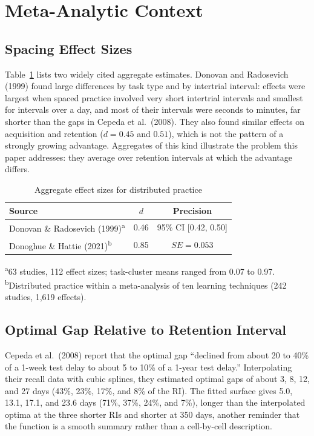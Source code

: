 \documentclass[10pt,twocolumn]{article}
\newcommand{\es}{d}
\begin{document}
\section{Meta-Analytic Context}

\subsection{Spacing Effect Sizes}

Table~\ref{tab:spacing} lists two widely cited aggregate estimates. Donovan and Radosevich (1999) found large differences by task type and by intertrial interval: effects were largest when spaced practice involved very short intertrial intervals and smallest for intervals over a day, and most of their intervals were seconds to minutes, far shorter than the gaps in Cepeda et al.\ (2008). They also found similar effects on acquisition and retention ($d = 0.45$ and $0.51$), which is not the pattern of a strongly growing advantage. Aggregates of this kind illustrate the problem this paper addresses: they average over retention intervals at which the advantage differs.

\begin{table}[!htbp]
\centering
\caption{Aggregate effect sizes for distributed practice}
\label{tab:spacing}
\small
\begin{tabular}{@{}lcc@{}}
\toprule
Source & $\es$ & Precision \\
\midrule
Donovan \& Radosevich (1999)\textsuperscript{a} & 0.46 & 95\% CI [0.42, 0.50] \\
Donoghue \& Hattie (2021)\textsuperscript{b} & 0.85 & $SE = 0.053$ \\
\bottomrule
\end{tabular}

\vspace{0.3em}
\raggedright
\footnotesize
\textsuperscript{a}63 studies, 112 effect sizes; task-cluster means ranged from 0.07 to 0.97. \textsuperscript{b}Distributed practice within a meta-analysis of ten learning techniques (242 studies, 1,619 effects).
\end{table}

\subsection{Optimal Gap Relative to Retention Interval}

Cepeda et al.\ (2008) report that the optimal gap ``declined from about 20 to 40\% of a 1-week test delay to about 5 to 10\% of a 1-year test delay.'' Interpolating their recall data with cubic splines, they estimated optimal gaps of about 3, 8, 12, and 27 days (43\%, 23\%, 17\%, and 8\% of the RI). The fitted surface gives 5.0, 13.1, 17.1, and 23.6 days (71\%, 37\%, 24\%, and 7\%), longer than the interpolated optima at the three shorter RIs and shorter at 350 days, another reminder that the function is a smooth summary rather than a cell-by-cell description.
\end{document}
